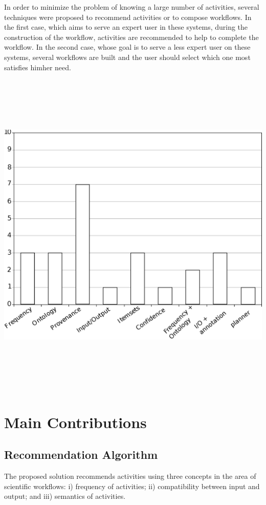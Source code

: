 \documentclass[40pt, a0, portrait]{a0poster}
\begin{document}
\begin{multicols}{2}
In order to minimize the problem of knowing a large number of activities, several techniques were proposed to recommend activities or to compose workflows. In the first case, which aims to serve an expert user in these systems, during the construction of the workflow, activities are recommended to help to complete the workflow. In the second case, whose goal is to serve a less expert user on these systems, several workflows are built and the user should select which one most satisfies him\/her need.
\begin{center}
\includegraphics[height=16cm, width=28cm]{GraficoQuantidadeTecnica.eps}
\end{center}

\color{DarkSlateGray} %

\section*{Main Contributions}

\subsection*{Recommendation Algorithm}
The proposed solution recommends activities using three concepts in the area of scientific  workflows: i) frequency of activities; ii) compatibility between input and output; and iii) semantics of activities. 


\end{multicols}
\end{document}
